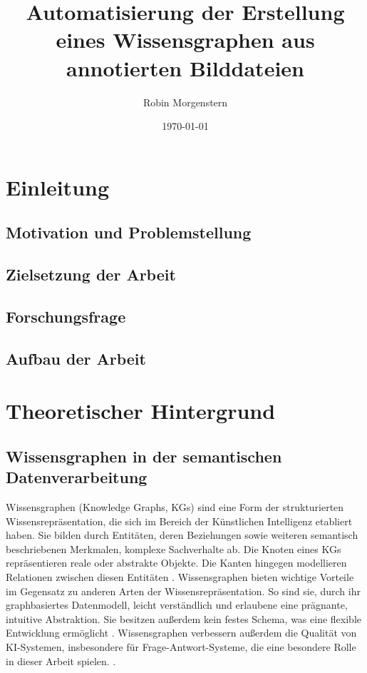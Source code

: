\documentclass[]{stthesis}
\title{Automatisierung der Erstellung eines Wissensgraphen aus annotierten Bilddateien}
\author{Robin Morgenstern}
\date{\today}
\begin{document}
  \maketitle %
  
  \tableofcontents
  
  \chapter{Einleitung}
    
    \section{Motivation und Problemstellung}

    \section{Zielsetzung der Arbeit}

    \section{Forschungsfrage}

    \section{Aufbau der Arbeit}
  	\lipsum
  	
    
  \chapter{Theoretischer Hintergrund}
  
     \section{Wissensgraphen in der semantischen Datenverarbeitung}
       Wissensgraphen (Knowledge Graphs, KGs) sind eine Form der strukturierten Wissensrepräsentation, die sich im Bereich der Künstlichen Intelligenz etabliert haben. Sie bilden durch Entitäten, deren Beziehungen sowie weiteren semantisch beschriebenen Merkmalen, komplexe Sachverhalte ab. Die Knoten eines KGs repräsentieren reale oder abstrakte Objekte. Die Kanten hingegen modellieren Relationen zwischen diesen Entitäten \cite{Ji2022}.
       Wissensgraphen bieten wichtige Vorteile im Gegensatz zu anderen Arten der Wissensrepräsentation. So sind sie, durch ihr graphbasiertes Datenmodell, leicht verständlich und erlaubene eine prägnante, intuitive Abstraktion. Sie besitzen außerdem kein festes Schema, was eine flexible Entwicklung ermöglicht \cite{Hogan2021}. Wissensgraphen verbessern außerdem die Qualität von KI-Systemen, insbesondere für Frage-Antwort-Systeme, die eine besondere Rolle in dieser Arbeit spielen. \cite{Peng2023}.
\end{document}
